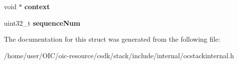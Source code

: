 \begin{DoxyCompactItemize}
\item 
\hypertarget{structrsrc__t_adf47f169c0e4656281cde13da5e9b17c}{}void $\ast$ {\bfseries context}\label{structrsrc__t_adf47f169c0e4656281cde13da5e9b17c}

\item 
\hypertarget{structrsrc__t_a1298a5fa98b33a2f603a6402a4aabbc3}{}uint32\+\_\+t {\bfseries sequence\+Num}\label{structrsrc__t_a1298a5fa98b33a2f603a6402a4aabbc3}

\end{DoxyCompactItemize}


The documentation for this struct was generated from the following file\+:\begin{DoxyCompactItemize}
\item 
/home/user/\+O\+I\+C/oic-\/resource/csdk/stack/include/internal/ocstackinternal.\+h\end{DoxyCompactItemize}

